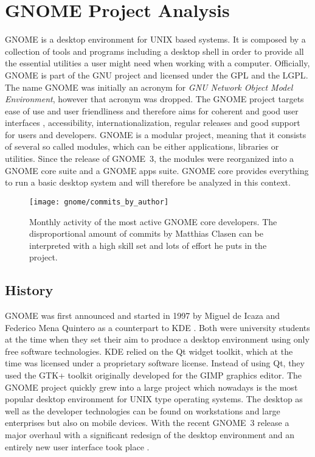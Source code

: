 \section{GNOME Project Analysis} %


GNOME is a desktop environment for UNIX based systems. It is composed by a
collection of tools and programs including a desktop shell in order to provide
all the essential utilities a user might need when working with a computer.
Officially, GNOME is part of the \ac{GNU} project and licensed under the
\ac{GPL} and the \ac{LGPL}. The name GNOME was initially an acronym for
\emph{GNU Network Object Model Environment}, however that acronym was dropped.
The GNOME project targets ease of use and user friendliness and therefore aims
for coherent and good user interfaces \cite{GNOMEHIG}, accessibility,
internationalization, regular releases and good support for users and
developers. GNOME is a modular project, meaning that it consists of several so
called modules, which can be either applications, libraries or utilities. Since
the release of GNOME~3, the modules were reorganized into a GNOME core suite
and a GNOME apps suite. GNOME core provides everything to run a basic desktop
system and will therefore be analyzed in this context.

\begin{figure}[htbp]
  \centering
  \texttt{[image: gnome/commits\_by\_author]}
  \caption[Commits by most active authors, GNOME]
  {Monthly activity of the most active GNOME core developers. The
    disproportional amount of commits by Matthias Clasen can be interpreted
    with a high skill set and lots of effort he puts in the project.}
\end{figure}

\subsection{History} %

GNOME was first announced and started in 1997 by Miguel de Icaza and Federico
Mena Quintero as a counterpart to KDE
\cite{German2003,GNOMEAbout,GNOMEAnnouncement}. Both were university students
at the time when they set their aim to produce a desktop environment using only
free software technologies. KDE relied on the Qt widget toolkit, which at the
time was licensed under a proprietary software license. Instead of using Qt,
they used the GTK+ toolkit originally developed for the GIMP graphics editor.
The GNOME project quickly grew into a large project which nowadays is the most
popular desktop environment for UNIX type operating systems. The desktop as
well as the developer technologies can be found on workstations and large
enterprises but also on mobile devices. With the recent GNOME~3 release a major
overhaul with a significant redesign of the desktop environment and an entirely
new user interface took place \cite{GNOMEPress}.

